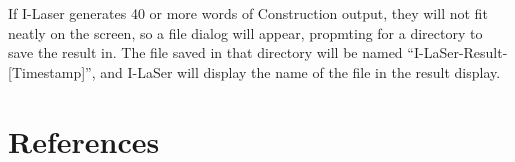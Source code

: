 \documentclass{article}
\begin{document}
\par If I-Laser generates 40 or more words of Construction output, they will not fit neatly on the screen, so a file dialog will appear, propmting for a directory to save the result in. The file saved in that directory will be named ``I-LaSer-Result-[Timestamp]'', and I-LaSer will display the name of the file in the result display.
\pagebreak
\section{References}
\printbibliography
%
\end{document}
